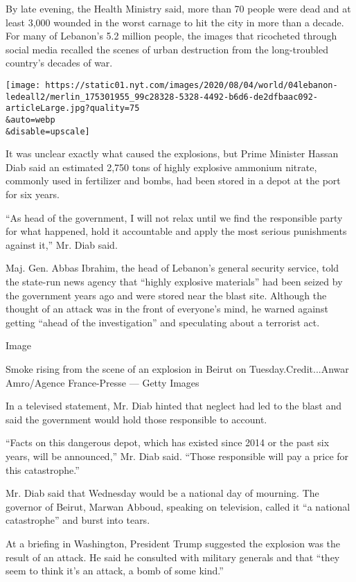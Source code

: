By late evening, the Health Ministry said, more than 70 people were dead
and at least 3,000 wounded in the worst carnage to hit the city in more
than a decade. For many of Lebanon's 5.2 million people, the images that
ricocheted through social media recalled the scenes of urban destruction
from the long-troubled country's decades of war.

\texttt{[image: https://static01.nyt.com/images/2020/08/04/world/04lebanon-ledeall2/merlin\_175301955\_99c28328-5328-4492-b6d6-de2dfbaac092-articleLarge.jpg?quality=75\\\&auto=webp\\\&disable=upscale]}

It was unclear exactly what caused the explosions, but Prime Minister
Hassan Diab said an estimated 2,750 tons of highly explosive ammonium
nitrate, commonly used in fertilizer and bombs, had been stored in a
depot at the port for six years.

``As head of the government, I will not relax until we find the
responsible party for what happened, hold it accountable and apply the
most serious punishments against it,'' Mr. Diab said.

Maj. Gen. Abbas Ibrahim, the head of Lebanon's general security service,
told the state-run news agency that ``highly explosive materials'' had
been seized by the government years ago and were stored near the blast
site. Although the thought of an attack was in the front of everyone's
mind, he warned against getting ``ahead of the investigation'' and
speculating about a terrorist act.

Image

Smoke rising from the scene of an explosion in Beirut on
Tuesday.Credit...Anwar Amro/Agence France-Presse --- Getty Images

In a televised statement, Mr. Diab hinted that neglect had led to the
blast and said the government would hold those responsible to account.

``Facts on this dangerous depot, which has existed since 2014 or the
past six years, will be announced,'' Mr. Diab said. ``Those responsible
will pay a price for this catastrophe.''

Mr. Diab said that Wednesday would be a national day of mourning. The
governor of Beirut, Marwan Abboud, speaking on television, called it ``a
national catastrophe'' and burst into tears.

At a briefing in Washington, President Trump suggested the explosion was
the result of an attack. He said he consulted with military generals and
that ``they seem to think it's an attack, a bomb of some kind.''

